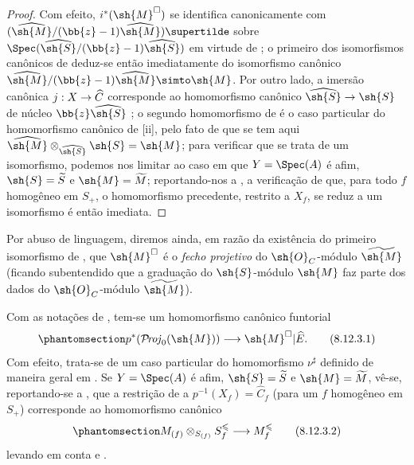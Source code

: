\documentclass[oneside,10pt]{amsart}
\makeatletter
\renewcommand{\leq}{\leqslant}
\newcommand{\ega@arrow}[2]{\mathchoice{#1}{#2}{#2}{#2}}
\renewcommand{\to}{\ega@arrow{\longrightarrow}{\rightarrow}}
\def\shProj{\mathcal{P}\!\mathit{roj}}
\newcommand{\oldpage}[2][]{\marginnote{\normalfont\footnotesize\textbf{#1}~|~#2}\ignorespaces}
\let\EGAOriginalLabel\label
\renewcommand{\label}[1]{\phantomsection\EGAOriginalLabel{#1}}
\makeatother
\begin{document}
\begin{proof}
Com efeito, $i^*(\sh{M}^\square)$ se identifica canonicamente com $(\widehat{\sh{M}}/(\bb{z}-1)\widehat{\sh{M}})\supertilde$ sobre $\Spec(\widehat{\sh{S}}/(\bb{z}-1)\widehat{\sh{S}})$ em virtude de ;
o primeiro dos isomorfismos canônicos de  deduz-se então imediatamente  do isomorfismo canônico $\widehat{\sh{M}}/(\bb{z}-1)\widehat{\sh{M}}\simto\sh{M}$.
Por outro lado, a imersão canônica $j:X\to\widehat{C}$ corresponde ao homomorfismo canônico $\widehat{\sh{S}}\to\sh{S}$ de núcleo $\bb{z}\widehat{\sh{S}}$ ;
o segundo homomorfismo de  é o caso particular do homomorfismo canônico de [ii], pelo fato de que se tem aqui $\widehat{\sh{M}}\otimes_{\widehat{\sh{S}}}\sh{S}=\sh{M}$;
para verificar que se trata de um isomorfismo, podemos nos limitar ao caso em que $Y=\Spec(A)$ é afim, $\sh{S}=\widetilde{S}$ e $\sh{M}=\widetilde{M}$;
reportando-nos a , a verificação de que, para todo $f$ homogêneo em $S_+$, o homomorfismo precedente, restrito a $X_f$, se reduz a um isomorfismo é então imediata.
\end{proof}
\oldpage[II]{193}

Por abuso de linguagem, diremos ainda, em razão da existência do primeiro isomorfismo de , que $\sh{M}^\square$ é o \emph{fecho projetivo} do $\sh{O}_C$-módulo $\widetilde{\sh{M}}$ (ficando subentendido que a graduação do $\sh{S}$-módulo $\sh{M}$ faz parte dos dados do $\sh{O}_C$-módulo $\widetilde{\sh{M}}$).

\begin{env}[8.12.3]
\label{II.8.12.3}
Com as notações de , tem-se um homomorfismo canônico funtorial
\[
\label{II.8.12.3.1}
  p^*(\shProj_0(\sh{M}))\to\sh{M}^\square|\widehat{E}.
\tag{8.12.3.1}
\]
Com efeito, trata-se de um caso particular do homomorfismo $\nu^\sharp$ definido de maneira geral em .
Se $Y=\Spec(A)$ é afim, $\sh{S}=\widetilde{S}$ e $\sh{M}=\widetilde{M}$, vê-se, reportando-se a , que a restrição de  a $p^{-1}(X_f)=\widehat{C}_f$ (para um $f$ homogêneo em $S_+$) corresponde ao homomorfismo canônico
\[
\label{II.8.12.3.2}
  M_{(f)}\otimes_{S_{(f)}}S_f^\leq\to M_f^\leq
\tag{8.12.3.2}
\]
levando em conta  e .
\end{env}
\end{document}
